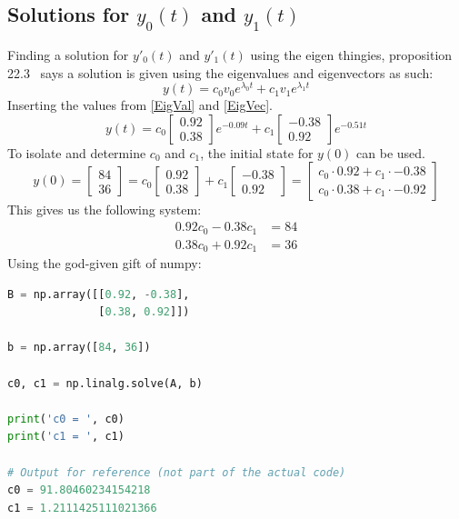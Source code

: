 \documentclass[12pt]{article}
\begin{document}
\subsection*{Solutions for $y_0(t)$ and $y_1(t)$}
Finding a solution for $y'_0(t)$ and $y'_1(t)$ using the eigen thingies, proposition 22.3~\cite{NUMLA} says a solution is given using the eigenvalues and eigenvectors as such:
\begin{equation*}
    y(t) = c_0v_0e^{\lambda_0 t} + c_1v_1e^{\lambda_1 t}
\end{equation*}
Inserting the values from \eqref{EigVal} and \eqref{EigVec}.
\begin{equation} \label{solution}
    y(t) = c_0  \begin{bmatrix}
        0.92 \\
        0.38
    \end{bmatrix} e^{-0.09t} + c_1 \begin{bmatrix}
        -0.38 \\
        0.92
    \end{bmatrix} e^{-0.51t}
\end{equation}
To isolate and determine $c_0$ and $c_1$, the initial state for $y(0)$ can be used.
\begin{equation*}
    y(0) = \begin{bmatrix}
        84 \\
        36
    \end{bmatrix} = c_0  \begin{bmatrix}
        0.92 \\
        0.38
    \end{bmatrix} + c_1 \begin{bmatrix}
        -0.38 \\
        0.92
    \end{bmatrix} = \begin{bmatrix}
        c_0 \cdot 0.92 + c_1 \cdot -0.38 \\
        c_0 \cdot 0.38 + c_1 \cdot -0.92
    \end{bmatrix}
\end{equation*}
This gives us the following system:
\begin{align*}
    0.92c_0 - 0.38c_1 &= 84 \\
    0.38c_0 + 0.92c_1 &= 36
\end{align*}
Using the god-given gift of numpy:
\begin{lstlisting}[language=Python]
B = np.array([[0.92, -0.38], 
              [0.38, 0.92]])

b = np.array([84, 36])

c0, c1 = np.linalg.solve(A, b)

print('c0 = ', c0)
print('c1 = ', c1)

# Output for reference (not part of the actual code)
c0 = 91.80460234154218
c1 = 1.2111425111021366
\end{lstlisting}
\end{document}
